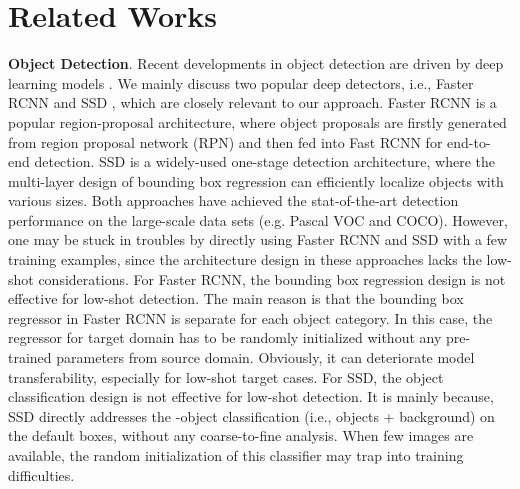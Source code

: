 \documentclass[letterpaper]{article} \usepackage{aaai18}  \usepackage{times}  \usepackage{helvet}  \usepackage{courier}  \usepackage{url}  \usepackage{graphicx}
\begin{document}
\section{Related Works}


\textbf{Object Detection}.
Recent developments in object detection are driven by deep learning models \cite{Girshick2014,Girshick2016Fast,ren2015faster,redmon2016you,Liueccv2016,He2017}.
We mainly discuss two popular deep detectors,
i.e.,
Faster RCNN \cite{ren2015faster} and SSD \cite{Liueccv2016},
which are closely relevant to our approach.
Faster RCNN is a popular region-proposal architecture,
where object proposals are firstly generated from region proposal network (RPN) and then fed into Fast RCNN \cite{Girshick2016Fast} for end-to-end detection.
SSD is a widely-used one-stage detection architecture,
where the multi-layer design of bounding box regression can efficiently localize objects with various sizes.
Both approaches have achieved the stat-of-the-art detection performance on the large-scale data sets (e.g. Pascal VOC and COCO).
However,
one may be stuck in troubles by directly using Faster RCNN and SSD with a few training examples,
since the architecture design in these approaches lacks the low-shot considerations.
For Faster RCNN,
the bounding box regression design is not effective for low-shot detection.
The main reason is that the bounding box regressor in Faster RCNN is separate for each object category.
In this case,
the regressor for target domain has to be randomly initialized without any pre-trained parameters from source domain.
Obviously,
it can deteriorate model transferability,
especially for low-shot target cases.
For SSD,
the object classification design is not effective for low-shot detection.
It is mainly because,
SSD directly addresses the -object classification (i.e.,  objects + background) on the default boxes,
without any coarse-to-fine analysis.
When few images are available,
the random initialization of this classifier may trap into training difficulties.
\end{document}
